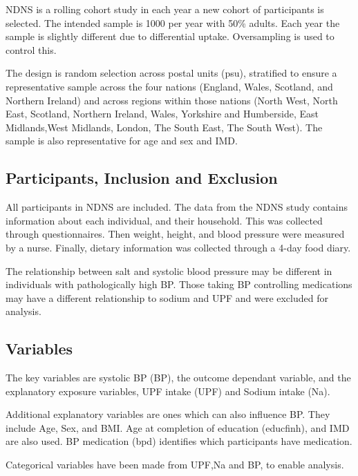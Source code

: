 \documentclass[
]{article}
\begin{document}
NDNS is a rolling cohort study in each year a new cohort of participants
is selected. The intended sample is 1000 per year with 50\% adults. Each
year the sample is slightly different due to differential uptake.
Oversampling is used to control this.

The design is random selection across postal units (psu), stratified to
ensure a representative sample across the four nations (England, Wales,
Scotland, and Northern Ireland) and across regions within those nations
(North West, North East, Scotland, Northern Ireland, Wales, Yorkshire
and Humberside, East Midlands,West Midlands, London, The South East, The
South West). The sample is also representative for age and sex and IMD.

\hypertarget{participants-inclusion-and-exclusion}{%
\subsection{Participants, Inclusion and
Exclusion}\label{participants-inclusion-and-exclusion}}

All participants in NDNS are included. The data from the NDNS study
contains information about each individual, and their household. This
was collected through questionnaires. Then weight, height, and blood
pressure were measured by a nurse. Finally, dietary information was
collected through a 4-day food diary.

The relationship between salt and systolic blood pressure may be
different in individuals with pathologically high BP. Those taking BP
controlling medications may have a different relationship to sodium and
UPF and were excluded for analysis.

\hypertarget{variables}{%
\subsection{Variables}\label{variables}}

The key variables are systolic BP (BP), the outcome dependant variable,
and the explanatory exposure variables, UPF intake (UPF) and Sodium
intake (Na).

Additional explanatory variables are ones which can also influence BP.
They include Age, Sex, and BMI. Age at completion of education
(educfinh), and IMD are also used. BP medication (bpd) identifies which
participants have medication.

Categorical variables have been made from UPF,Na and BP, to enable
analysis.
\end{document}

